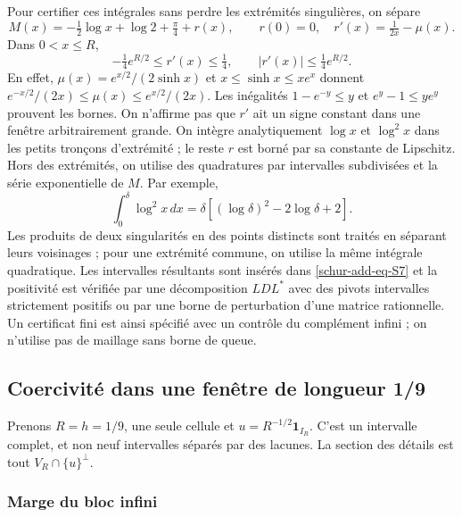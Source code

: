 Pour certifier ces intégrales sans perdre les extrémités singulières,
on sépare
\begin{equation}
M(x)=-\tfrac12\log x+\log2+\tfrac\pi4+r(x),
\qquad r(0)=0,\quad r'(x)=\tfrac1{2x}-\mu(x).
\label{schur-add-eq-S8}
\end{equation}
Dans \(0<x\leq R\),
\begin{equation}
-\tfrac14 e^{R/2}\leq r'(x)\leq\tfrac14,
\qquad |r'(x)|\leq\tfrac14e^{R/2}.
\label{schur-add-display-19}
\end{equation}
En effet, \(\mu(x)=e^{x/2}/(2\sinh x)\) et
\(x\leq\sinh x\leq xe^x\) donnent
\(e^{-x/2}/(2x)\leq\mu(x)\leq e^{x/2}/(2x)\).
Les inégalités \(1-e^{-y}\leq y\) et \(e^y-1\leq ye^y\)
prouvent les bornes. On n'affirme pas que \(r'\) ait un signe constant
dans une fenêtre arbitrairement grande.
On intègre analytiquement \(\log x\) et \(\log^2x\) dans les petits
tronçons d'extrémité ; le reste \(r\) est borné par sa constante de Lipschitz.
Hors des extrémités, on utilise des quadratures par intervalles subdivisées et
la série exponentielle de \(M\). Par exemple,
\begin{equation}
\int_0^\delta\log^2x\,dx
=\delta[(\log\delta)^2-2\log\delta+2].
\label{schur-add-display-20}
\end{equation}
Les produits de deux singularités en des points distincts sont traités
en séparant leurs voisinages ; pour une extrémité commune, on utilise la même
intégrale quadratique. Les intervalles résultants sont insérés dans \eqref{schur-add-eq-S7} et
la positivité est vérifiée par une décomposition \(LDL^*\) avec
des pivots intervalles strictement positifs ou par une borne de perturbation
d'une matrice rationnelle. Un certificat fini est ainsi spécifié
avec un contrôle du complément infini ; on n'utilise pas de maillage sans borne de queue.

\subsection{Coercivité dans une fenêtre de longueur 1/9}
\label{schur-add-sub-248}

Prenons \(R=h=1/9\), une seule cellule et \(u=R^{-1/2}\mathbf1_{I_R}\). C'est un intervalle complet, et non neuf intervalles séparés par des lacunes. La section des détails est tout \(V_R\cap\{u\}^{\perp}\).

\subsubsection{Marge du bloc infini}
\label{schur-add-sub-254}

